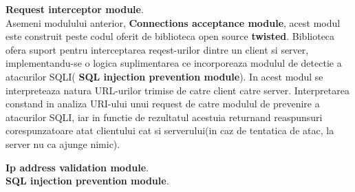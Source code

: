  \textbf{Request interceptor module}.\\
 
 Asemeni modulului anterior, \textbf{Connections acceptance module}, acest modul este construit peste codul oferit de biblioteca open source \textbf{twisted}. Biblioteca ofera suport pentru interceptarea reqest-urilor dintre un client si server, implementandu-se o logica suplimentarea ce incorporeaza modulul de detectie a atacurilor SQLI( \textbf{SQL injection prevention module}). In acest modul se interpreteaza natura URL-urilor trimise de catre client catre server.
 Interpretarea constand in analiza URI-ului unui request de catre modulul de prevenire a atacurilor SQLI, iar in functie de rezultatul acestuia returnand reaspunsuri corespunzatoare atat clientului cat si serverului(in caz de tentatica de atac, la server nu ca ajunge nimic).
 
\textbf{Ip address validation module}. \\



 \textbf{SQL injection prevention module}. \\

